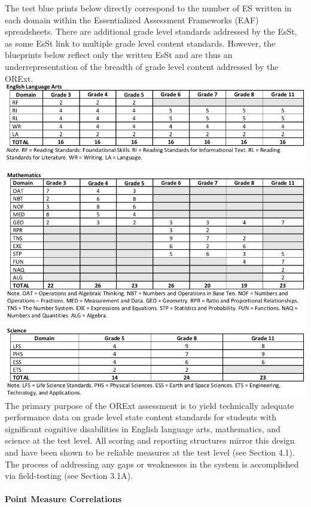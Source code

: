 \documentclass[]{article}
\let\oldparagraph\paragraph
\renewcommand{\paragraph}[1]{\oldparagraph{#1}\mbox{}}
\begin{document}
The test blue prints below directly correspond to the number of ES
written in each domain within the Essentialized Assessment Frameworks
(EAF) spreadsheets. There are additional grade level standards addressed
by the EsSt, as some EsSt link to multiple grade level content
standards. However, the blueprints below reflect only the written EsSt
and are thus an underrepresentation of the breadth of grade level
content addressed by the ORExt. \FloatBarrier
\includegraphics{Figures/EsSt/EsStELA.png}

\FloatBarrier
\includegraphics{Figures/EsSt/EsStMathScience.png} The primary purpose
of the ORExt assessment is to yield technically adequate performance
data on grade level state content standards for students with
significant cognitive disabilities in English language arts,
mathematics, and science at the test level. All scoring and reporting
structures mirror this design and have been shown to be reliable
measures at the test level (see Section 4.1). The process of addressing
any gaps or weaknesses in the system is accomplished via field-testing
(see Section 3.1A).

\paragraph{Point Measure Correlations}\label{point-measure-correlations}
\end{document}
